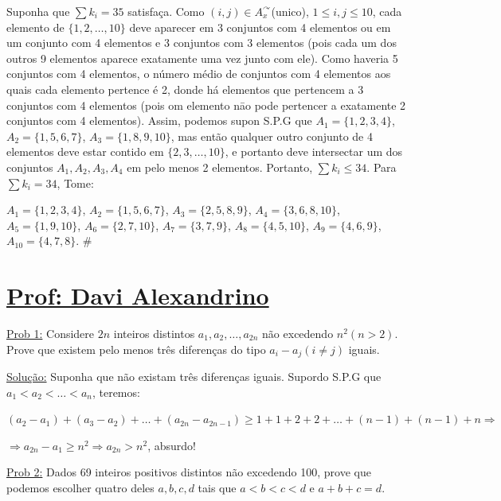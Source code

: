 \documentclass[a4paper,12pt]{article}
\renewcommand{\leq}{\ensuremath{\leqslant}}
\renewcommand{\geq}{\ensuremath{\geqslant}}
\theoremstyle{plain} %
\theoremstyle{definition} %
\theoremstyle{remark} %
\begin{document}
\begin{framed}
		Suponha que $\sum k_i=35$ satisfa\c{c}a. Como $(i,j)\in A_{x}^{\curvearrowright}$(unico), $1\leq i,j\leq 10$, cada elemento de $\{1,2,\dotso,10\}$ deve aparecer em 3 conjuntos com 4 elementos ou em um conjunto com 4 elementos e 3 conjuntos com 3 elementos (pois cada um dos outros 9 elementos aparece exatamente uma vez junto com ele). Como haveria 5 conjuntos com 4 elementos, o n\'umero m\'edio de conjuntos com 4 elementos aos quais cada elemento pertence \'e 2, donde h\'a elementos que pertencem a 3 conjuntos com 4 elementos (pois om elemento n\=ao pode pertencer a exatamente 2 conjuntos com 4 elementos). Assim, podemos supon S.P.G que $A_1=\{1,2,3,4\}$, $A_2=\{1,5,6,7\}$, $A_3=\{1,8,9,10\}$, mas ent\~ao qualquer outro conjunto de 4 elementos deve estar contido em $\{2,3,\dotso,10\}$, e portanto deve intersectar um dos conjuntos $A_1,A_2,A_3,A_4$ em pelo menos 2 elementos. Portanto, $\sum k_i\leq 34$. Para $\sum k_i=34$, Tome: 
		
		$A_1=\{1,2,3,4\}$, $A_2=\{1,5,6,7\}$, $A_3=\{2,5,8,9\}$, $A_4=\{3,6,8,10\}$, $A_5=\{1,9,10\}$, $A_6=\{2,7,10\}$, $A_7=\{3,7,9\}$, $A_8=\{4,5,10\}$, $A_9=\{4,6,9\}$, $A_10=\{4,7,8\}$. \huge\#
	\end{framed}
	
	\normalsize
	
	\newpage
	\section*{\underline{Prof: Davi Alexandrino}}
	
	\vspace{1ex}\underline{Prob 1:} Considere $2n$ inteiros distintos $a_1,a_2,\dotso, a_{2n}$ n\~ao excedendo $n^2(n>2)$. Prove que existem pelo menos tr\^es diferen\c{c}as do tipo $a_i-a_j(i\neq j)$ iguais.
	
	\begin{framed}
		\underline{Solu\c{c}\~ao:} Suponha que n\~ao existam tr\^es diferen\c{c}as iguais. Supordo S.P.G que $a_1<a_2<\dotso<a_n$, teremos:
		
		$(a_2-a_1)+(a_3-a_2)+\dotso+(a_{2n}-a_{2n-1})\geq 1+1+2+2+\dotso+(n-1)+(n-1)+n\Rightarrow$
		
		$\Rightarrow a_{2n}-a_1\geq n^2\Rightarrow a_{2n}>n^2$, absurdo! \tiny\textblock
	\end{framed}
	
	\normalsize
	
	\vspace{2ex}\underline{Prob 2:} Dados 69 inteiros positivos distintos n\~ao excedendo 100, prove que podemos escolher quatro deles $a,b,c,d$ tais que $a<b<c<d$ e $a+b+c=d$.
	
\end{document}
